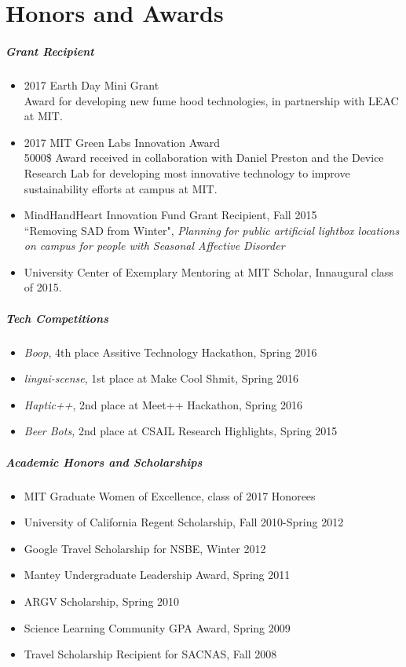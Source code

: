 \documentclass[10pt,letterpaper]{article}
\begin{document}
\section*{Honors and Awards}
\subparagraph{Grant Recipient}
\begin{itemize}
\item 2017 Earth Day Mini Grant \\
Award for developing new fume hood technologies, in partnership with LEAC at MIT.
\item 2017 MIT Green Labs Innovation Award\\
5000\$ Award received in collaboration with Daniel Preston and the Device Research Lab for developing most innovative technology to improve sustainability efforts at campus at MIT. 
\item MindHandHeart Innovation Fund Grant Recipient, Fall 2015\\
``Removing SAD from Winter", {\em Planning for public artificial lightbox locations on campus for people with Seasonal Affective Disorder }
\item University Center of Exemplary Mentoring at MIT Scholar, Innaugural class of 2015.
\end{itemize}
\subparagraph{Tech Competitions}
\begin{itemize}
\item {\em Boop}, 4th place Assitive Technology Hackathon, Spring 2016
\item {\em lingui-scense}, 1st place at Make Cool Shmit, Spring 2016
\item {\em Haptic++}, 2nd place at Meet++ Hackathon, Spring 2016
\item {\em Beer Bots,} 2nd place at CSAIL Research Highlights, Spring 2015 
\end{itemize}
\subparagraph{Academic Honors and Scholarships}
\begin{itemize}
\item MIT Graduate Women of Excellence, class of 2017 Honorees
\item University of California Regent Scholarship, Fall 2010-Spring 2012 
\item  Google Travel Scholarship for NSBE,  Winter 2012 
\item Mantey Undergraduate Leadership Award,  Spring 2011 
 \item ARGV Scholarship, Spring 2010 
\item  Science Learning Community GPA Award, Spring 2009 
\item Travel Scholarship Recipient for SACNAS, Fall 2008 
\end{itemize}
\end{document}
